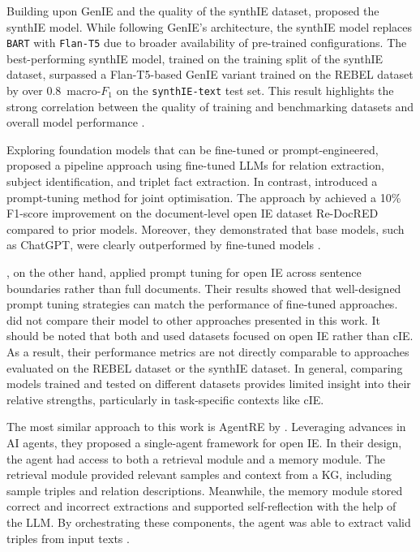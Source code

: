 \documentclass[a4paper,oneside,bibliography=totoc]{scrbook}
\begin{document}
Building upon GenIE and the quality of the synthIE dataset, \citet{Josifoski2023} proposed the synthIE model. While following GenIE’s architecture, the synthIE model replaces \texttt{BART} with \texttt{Flan-T5} due to broader availability of pre-trained configurations. The best-performing synthIE model, trained on the training split of the synthIE dataset, surpassed a Flan-T5-based GenIE variant trained on the REBEL dataset by over 0.8~macro-$F_{1}$ on the \texttt{synthIE-text} test set. This result highlights the strong correlation between the quality of training and benchmarking datasets and overall model performance \cite{Josifoski2023}.

Exploring foundation models that can be fine-tuned or prompt-engineered, \citet{Xue2024} proposed a pipeline approach using fine-tuned \acp{LLM} for relation extraction, subject identification, and triplet fact extraction. In contrast, \citet{Chen2024} introduced a prompt-tuning method for joint optimisation. The approach by \citet{Xue2024} achieved a 10\% F1-score improvement on the document-level open \ac{IE} dataset Re-DocRED compared to prior models. Moreover, they demonstrated that base models, such as ChatGPT, were clearly outperformed by fine-tuned models \cite{Xue2024}.

\citet{Chen2024}, on the other hand, applied prompt tuning for open \ac{IE} across sentence boundaries rather than full documents. Their results showed that well-designed prompt tuning strategies can match the performance of fine-tuned approaches. \citet{Chen2024} did not compare their model to other approaches presented in this work. It should be noted that both \citet{Chen2024} and \citet{Xue2024} used datasets focused on open \ac{IE} rather than \ac{cIE}. As a result, their performance metrics are not directly comparable to approaches evaluated on the REBEL dataset or the synthIE dataset. In general, comparing models trained and tested on different datasets provides limited insight into their relative strengths, particularly in task-specific contexts like \ac{cIE}.

The most similar approach to this work is AgentRE by \citet{Shi2024}. Leveraging advances in AI agents, they proposed a single-agent framework for open \ac{IE}. In their design, the agent had access to both a retrieval module and a memory module. The retrieval module provided relevant samples and context from a \ac{KG}, including sample triples and relation descriptions. Meanwhile, the memory module stored correct and incorrect extractions and supported self-reflection with the help of the \ac{LLM}. By orchestrating these components, the agent was able to extract valid triples from input texts \cite{Shi2024}.
\end{document}
